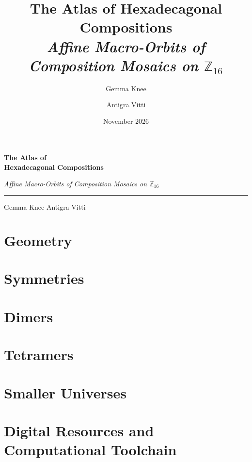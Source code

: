\documentclass[11pt,a4paper,openany]{book}
\title{\textbf{\Huge The Atlas of Hexadecagonal Compositions}\\[0.4cm] {\Large\itshape Affine Macro-Orbits of Composition Mosaics on \texorpdfstring{$\mathbb{Z}_{16}$}{Z16}}}
\author{Gemma Knee \and Antigra Vitti}
\date{November 2026}
\theoremstyle{breakthm}
\theoremstyle{breakdef}
\numberwithin{equation}{chapter}
\begin{document}
\frontmatter

\begin{titlepage}
\centering
\vspace*{0.8cm}
{\Huge \bfseries The Atlas of\\[0.35cm] Hexadecagonal Compositions\par}
\vspace{0.45cm}
{\Large\itshape Affine Macro-Orbits of Composition Mosaics on $\mathbb{Z}_{16}$\par}
\vspace{0.6cm}
\rule{0.35\textwidth}{0.8pt}\par
\vspace{0.6cm}
{\Large Gemma Knee \qquad Antigra Vitti\par}
\vspace{0.8cm}



\vfill
\vspace*{0.4cm}
\end{titlepage}



\tableofcontents

\mainmatter

\chapter{Geometry}
\label{chap:geometry}



\chapter{Symmetries}
\label{chap:singular}


\chapter{Dimers}
\label{chap:dimers}


\chapter{Tetramers}
\label{chap:tetramers}


\appendix

\chapter{Smaller Universes}
\label{app:small-universes}


\chapter{Digital Resources and Computational Toolchain}
\label{app:digital-companion}


\backmatter

\end{document}
